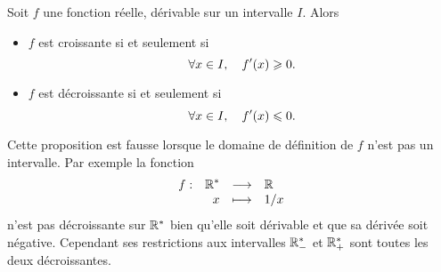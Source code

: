 \documentclass{magnolia}
\begin{document}
\begin{proposition}[utile=3]
Soit $f$ une fonction réelle, dérivable sur un intervalle $I$. Alors
\begin{itemize}
\item $f$ est croissante si et seulement si
  \[\forall x\in I ,\quad f'(x)\geqslant 0.\]
\item $f$ est décroissante si et seulement si
  \[\forall x\in I ,\quad f'(x)\leqslant 0.\]
\end{itemize}
\end{proposition}

\begin{remarqueUnique}
\remarque Cette proposition est fausse lorsque le domaine de définition de $f$
  n'est pas un intervalle. Par exemple la fonction
  \[\begin{array}[t]{lrcl} \displaystyle{f} : & \displaystyle{{\mathbb{R}^*}} & \longrightarrow & \displaystyle{\mathbb{R}} \\ & \displaystyle{x} & \longmapsto & \displaystyle{1/x} \end{array}\]
  n'est pas décroissante sur ${\mathbb{R}^*}$ bien qu'elle soit dérivable et que sa dérivée soit
  négative. Cependant ses restrictions
  aux intervalles $\mathbb{R}_-^*$ et $\mathbb{R}_+^*$ sont toutes les deux décroissantes.
\end{remarqueUnique}
\end{document}

